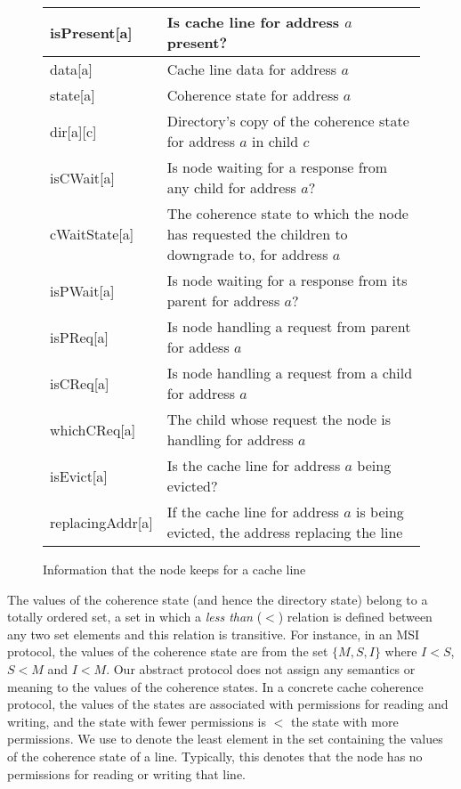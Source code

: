 \begin{figure}
\begin{tabular}{|l|p{}|}
\hline
isPresent[a] & Is cache line for address $a$ present?\\
\hline
data[a] & Cache line data for address $a$\\
\hline
state[a] & Coherence state for address $a$\\
\hline
dir[a][c] & Directory's copy of the coherence state for address $a$ in child
$c$\\
\hline
isCWait[a] & Is node waiting for a response from any child for address $a$?\\
\hline
cWaitState[a] & The coherence state to which the node has requested the children to
downgrade to, for address $a$\\
\hline
isPWait[a] & Is node waiting for a response from its parent for
address $a$?\\
\hline
isPReq[a] & Is node handling a request from parent for addess $a$\\
\hline
isCReq[a] & Is node handling a request from a child for address $a$\\
\hline
whichCReq[a] & The child whose request the node is handling for address $a$\\
\hline
isEvict[a] & Is the cache line for address $a$ being evicted?\\
\hline
replacingAddr[a] & If the cache line for address $a$ is being evicted, the address replacing the line\\
\hline
\end{tabular}
\caption{Information that the node keeps for a cache line}
\label{table:states}
\end{figure}

The values of the coherence state (and hence the directory state) belong to a
totally ordered set, \ie a set in which a \emph{less than} ($<$) relation is
defined between any two set elements and this relation is
transitive. For instance, in an MSI protocol, the values of the coherence state
are from the set $\{M, S, I\}$ where $I < S$, $S < M$ and $I < M$. Our abstract
protocol does not assign any semantics or meaning to the values of the coherence
states. In a concrete cache coherence protocol, the values of the states are
associated with permissions for reading and writing, and the state with fewer
permissions is $<$ the state with more permissions. We use \Inv to denote the
least element in the set containing the values of the coherence state of a line.
Typically, this denotes that the node has no permissions for reading or writing
that line.


